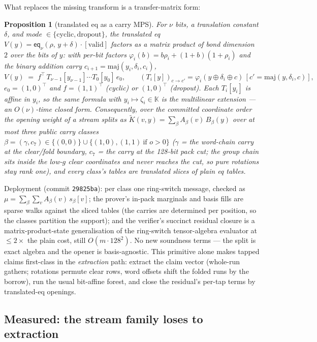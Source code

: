 \documentclass[11pt]{article}
\newcommand{\K}{\mathbb{K}}            %
\newcommand{\eq}{\mathsf{eq}}
\theoremstyle{plain}
\newtheorem{proposition}[theorem]{Proposition}
\theoremstyle{definition}
\theoremstyle{remark}
\begin{document}
What replaces the missing transform is a transfer-matrix form:

\begin{proposition}[translated eq as a carry MPS]\label{prop:transeq}
For $\nu$ bits, a translation constant $\delta$, and mode
$\in\{\text{cyclic},\text{dropout}\}$, the translated eq
$V(y)=\eq_\nu(\rho,\,y+\delta)\cdot[\mathrm{valid}]$ factors as a
matrix product of bond dimension $2$ over the bits of $y$: with
per-bit factors $\varphi_i(b)=b\rho_i+(1+b)(1+\rho_i)$ and the binary
addition carry $c_{i+1}=\mathrm{maj}(y_i,\delta_i,c_i)$,
\[
  V(y)\;=\;f^{\!\top}\,T_{\nu-1}[y_{\nu-1}]\cdots T_0[y_0]\,e_0,
  \qquad
  (T_i[y])_{c\to c'}=\varphi_i(y\oplus\delta_i\oplus c)\,
  [c'=\mathrm{maj}(y,\delta_i,c)],
\]
$e_0=(1,0)^{\!\top}$ and $f=(1,1)^{\!\top}$ (cyclic) or $(1,0)^{\!\top}$
(dropout). Each $T_i[y_i]$ is affine in $y_i$, so the same formula with
$y_i\mapsto\zeta_i\in\K$ \emph{is} the multilinear extension --- an
$O(\nu)$-time closed form. Consequently, over the committed coordinate
order the opening weight of a stream splits as
$\widetilde K(v,y)=\sum_\beta A_\beta(v)\,B_\beta(y)$ over at most
\emph{three} public carry classes
$\beta=(\gamma,c_7)\in\{(0,0)\}\cup\{(1,0),(1,1)\ \text{if }o>0\}$
($\gamma$ = the word-chain carry at the clear/fold boundary, $c_7$ =
the carry at the 128-bit pack cut; the group chain sits inside the
low-$g$ clear coordinates and never reaches the cut, so pure rotations
stay rank one), and every class's tables are translated \emph{slices}
of plain eq tables.
\end{proposition}

Deployment (commit \texttt{29825ba}): per class one ring-switch message,
checked as $\mu=\sum_\beta\sum_v A_\beta(v)\,s_\beta[v]$; the prover's
in-pack marginals and basis fills are sparse walks against the sliced
tables (the carries are determined per position, so the classes
partition the support); and the verifier's succinct residual closure is
a matrix-product-state generalisation of the ring-switch tensor-algebra
evaluator at $\le2\times$ the plain cost, still $O(m\cdot128^{2})$. No
new soundness terms --- the split is exact algebra and the opener is
basis-agnostic. This primitive alone makes tapped claims first-class in
the \emph{extraction} path: extract the claim vector (whole-run
gathers; rotations permute clear rows, word offsets shift the folded
runs by the borrow), run the usual bit-affine forest, and close the
residual's per-tap terms by translated-eq openings.

\subsection{Measured: the stream family loses to extraction}
\label{sec:tapmeasured}
\end{document}

